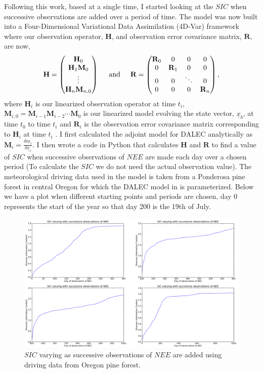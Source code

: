 \documentclass[11pt]{article}
\begin{document}
Following this work, based at a single time, I started looking at the $SIC$ when successive observations are added over a period of time. The model was now built into a Four-Dimensional Variational Data Assimilation (4D-Var) framework where our observation operator, $\textbf{H}$, and observation error covariance matrix, $\textbf{R}$, are now,
\[ 
\textbf{H}=
\begin{pmatrix}
\textbf{H}_0 \\
\textbf{H}_1\textbf{M}_0\\
\vdots \\
\textbf{H}_n\textbf{M}_{n,0}
\end{pmatrix}
\hspace{5mm} \text{and} \hspace{5mm}
\textbf{R}=
\begin{pmatrix}
\textbf{R}_0 & 0 & 0 & 0 \\
0 & \textbf{R}_1 & 0 & 0 \\
0 & 0 & \ddots & 0 \\
0 & 0 & 0 & \textbf{R}_n
\end{pmatrix},
\]
where $\textbf{H}_i$ is our linearized observation operator at time $t_i$, $\textbf{M}_{i,0}=\textbf{M}_{i-1}\textbf{M}_{i-2}\cdots\textbf{M}_0$ is our linearized model evolving the state vector, $\underline{x}_b$, at time $t_0$ to time $t_i$ and $\textbf{R}_i$ is the observation error covariance matrix corresponding to $\textbf{H}_i$ at time $t_i$ \cite{lewis2006dynamic}. I first calculated the adjoint model for DALEC analytically as $\textbf{M}_i=\frac{\delta \underline{m}_i}{\delta \underline{x}_i}$. I then wrote a code in Python that calculates $\textbf{H}$ and $\textbf{R}$ to find a value of $SIC$ when successive observations of $NEE$ are made each day over a chosen period (To calculate the $SIC$ we do not need the actual observation value). The meteorological driving data used in the model is taken from a Ponderosa pine forest in central Oregon for which the DALEC model in \cite{williams2005improved} is parameterized. Below we have a plot when different starting points and periods are chosen, day 0 represents the start of the year so that day 200 is the 19th of July.

\begin{figure}[ht]
\centering
\includegraphics[width=1\textwidth]{SICsubplot.png}
\caption{$SIC$ varying as successive observations of $NEE$ are added using driving data from Oregon pine forest.}
\label{fig:SIC_subplot}
\end{figure}
\end{document}
